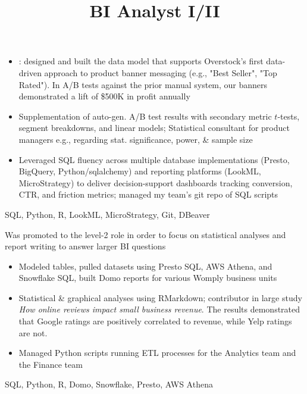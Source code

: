 \documentclass[resmargin, centered, 10pt]{res}
\begin{document}
\begin{resume}
\begin{position}
	\begin{itemize}
		\item {}: designed and built the data model that supports Overstock's first data-driven approach to product banner messaging (e.g., "Best Seller", "Top Rated"). In A/B tests against the prior manual system, our banners demonstrated a lift of \$500K in profit annually
		\item {} Supplementation of auto-gen. A/B test results with secondary metric $t$-tests, segment breakdowns, and linear models; Statistical consultant for product managers e.g., regarding stat. significance, power, \& sample size
		\item {} Leveraged SQL fluency across multiple database implementations (Presto, BigQuery, Python/sqlalchemy) and reporting platforms (LookML, MicroStrategy) to deliver decision-support dashboards tracking conversion, CTR, and friction metrics; managed my team's git repo of SQL scripts
	\end{itemize}

	 SQL, Python, R, LookML, MicroStrategy, Git, DBeaver
\end{position}

\title{BI Analyst I/II}
\begin{position}
	Was promoted to the level-2 role in order to focus on statistical analyses and report writing to answer larger BI questions

	\begin{itemize}
		\item {} Modeled tables, pulled datasets using Presto SQL, AWS Athena, and Snowflake SQL, built Domo reports for various Womply business units
		\item {} Statistical  \& graphical analyses using RMarkdown; contributor in large study \textit{How online reviews impact small business revenue}. The results demonstrated that Google ratings are positively correlated to revenue, while Yelp ratings are not.
		\item {} Managed Python scripts running ETL processes for the Analytics team and the Finance team
	\end{itemize}

	 SQL, Python, R, Domo, Snowflake, Presto, AWS Athena
\end{position}


\end{resume}
\end{document}
